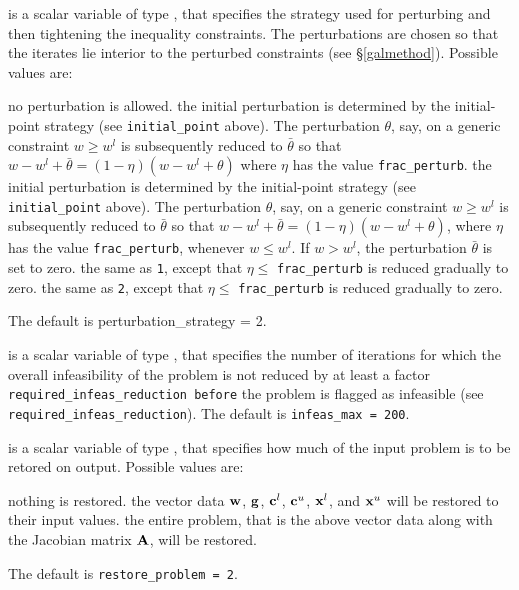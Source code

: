 \documentclass{galahad}
\begin{document}
\begin{description}

 is a scalar variable of type \integer, 
that specifies the strategy used for perturbing and then tightening
the inequality constraints. The perturbations are chosen so that the
iterates lie interior to the perturbed constraints (see \S\ref{galmethod}).
Possible values are:

\begin{description}
 no perturbation is allowed.
 the initial perturbation is determined by the initial-point
strategy (see {\tt initial\_point} above). The perturbation $\theta$, say,
on a generic constraint $w \geq w^l$ is subsequently 
reduced to $\bar{\theta}$ so that $w - w^l + \bar{\theta}
= ( 1 - \eta ) ( w - w^l + \theta )$
where $\eta$ has the value {\tt frac\_perturb}.
 the initial perturbation is determined by the initial-point
strategy (see {\tt initial\_point} above). The perturbation $\theta$, say,
on a generic constraint $w \geq w^l$ is subsequently 
reduced to $\bar{\theta}$ so that $w - w^l + \bar{\theta}
= ( 1 - \eta ) ( w - w^l + \theta )$,
where $\eta$ has the value {\tt frac\_perturb}, whenever $w \leq w^l$. If 
$w > w^l$, the perturbation  $\bar{\theta}$ is set to zero.
 the same as {\tt 1}, except that $\eta \leq$ {\tt frac\_perturb}
is reduced gradually to zero.
 the same as {\tt 2}, except that $\eta \leq$ {\tt frac\_perturb}
is reduced gradually to zero.
\end{description}
The default is {perturbation\_strategy = 2}.


 is a scalar variable of type \integer, that specifies
the number of iterations for which the overall infeasibility
of the problem is not reduced by at least a factor 
{\tt required\_infeas\_reduction
before} the problem is flagged as infeasible 
(see {\tt required\_infeas\_reduction}).
The default is {\tt infeas\_max = 200}.

 is a scalar variable of type \integer, that 
specifies how much of the input problem is to be retored on output. 
Possible values are:
\begin{description}
 nothing is restored. 
 the vector data ${\mathbf{w}}$, ${\mathbf{g}}$, 
   ${\mathbf{c}}^{l}$, ${\mathbf{c}}^{u}$, ${\mathbf{x}}^{l}$, and ${\mathbf{x}}^{u}$ 
   will be restored to their input values.
 the entire problem, that is the above vector data along with 
the Jacobian matrix ${\mathbf{A}}$, will be restored.
\end{description}
The default is {\tt restore\_problem = 2}.


\end{description}
\end{document}
